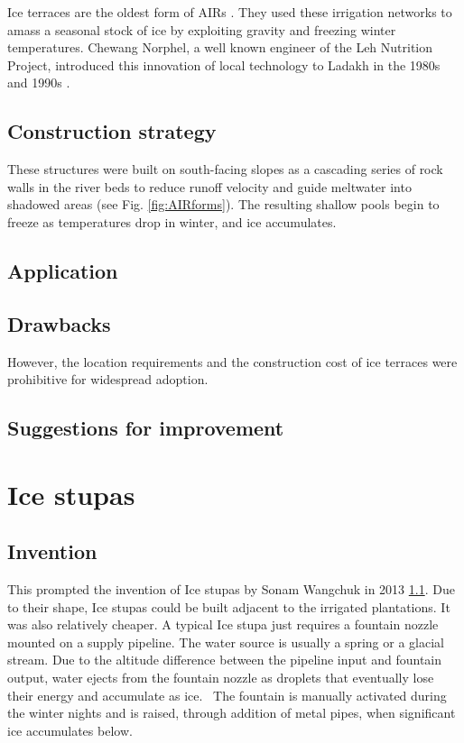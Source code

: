 Ice terraces are the oldest form of AIRs \citep{norphelArtificialGlacierHigh2009}. They used these irrigation
networks to amass a seasonal stock of ice by exploiting gravity and freezing winter temperatures. Chewang
Norphel, a well known engineer of the Leh Nutrition Project, introduced this innovation of local technology to
Ladakh in the 1980s and 1990s \citep{vinceGlacierMan2009}.

\subsection{Construction strategy}

These structures were built on south-facing slopes as a cascading series of rock walls in the river beds to
reduce runoff velocity and guide meltwater into shadowed areas (see Fig. \ref{fig:AIRforms}). The resulting
shallow pools begin to freeze as temperatures drop in winter, and ice accumulates. 

\subsection{Application}

\subsection{Drawbacks}

However, the location requirements and the construction cost of ice terraces were prohibitive for widespread
adoption. 

\subsection{Suggestions for improvement}

\section{Ice stupas}

\subsection{Invention}

This prompted the invention of Ice stupas by Sonam Wangchuk in 2013 \ref{}. Due to their shape, Ice
stupas could be built adjacent to the irrigated plantations. It was also relatively cheaper. A typical Ice stupa
just requires a fountain nozzle mounted on a supply pipeline. The water source is usually a spring or a glacial
stream. Due to the altitude difference between the pipeline input and fountain output, water ejects from the
fountain nozzle as droplets that eventually lose their energy and accumulate as ice.  The fountain is manually
activated during the winter nights and is raised, through addition of metal pipes, when significant ice
accumulates below.

